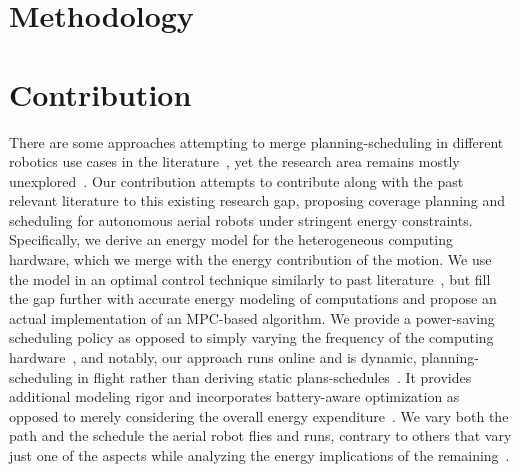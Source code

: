 \section{\color{red}Methodology}



\section{Contribution}
\label{sec:contribs}

There are some approaches attempting to merge planning-scheduling in different robotics use cases in the literature~\citep{mei2005case,mei2006deployment,brateman2006energy,zhang2007low,sadrpour2013experimental,sadrpour2013mission,ondruska2015scheduled,lahijanian2018resource,sudhakar2020balancing}, yet the research area remains mostly unexplored~\citep{sudhakar2020balancing,brateman2006energy}. Our contribution attempts to contribute along with the past relevant literature to this existing research gap, proposing coverage planning and scheduling for autonomous aerial robots under stringent energy constraints. Specifically, we derive an energy model for the heterogeneous computing hardware, which we merge with the energy contribution of the motion. We use the model in an optimal control technique similarly to past literature~\citep{zhang2007low,ondruska2015scheduled,lahijanian2018resource,brateman2006energy}, but fill the gap further with accurate energy modeling of computations and propose an actual implementation of an MPC-based algorithm. We provide a power-saving scheduling policy as opposed to simply varying the frequency of the computing hardware~\citep{zhang2007low,brateman2006energy}, and notably, our approach runs online and is dynamic, planning-scheduling in flight rather than deriving static plans-schedules~\citep{lahijanian2018resource}. It provides additional modeling rigor and incorporates battery-aware optimization as opposed to merely considering the overall energy expenditure~\citep{sudhakar2020balancing}. We vary both the path and the schedule the aerial robot flies and runs, contrary to others that vary just one of the aspects while analyzing the energy implications of the remaining~\citep{ondruska2015scheduled}.

